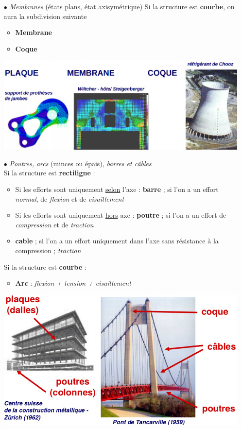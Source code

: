 \begin{itemize}
\item[$\bullet$] \textit{Membranes} (états plans, état axisymétrique)
Si la structure est \textbf{courbe}, on aura la subdivision suivante 
	\begin{itemize}
	\item \textbf{Membrane}
	\item \textbf{Coque}
	\end{itemize}
\begin{center}
\includegraphics[scale=0.4]{ch1/image1}
\end{center}
\newpage
\item[$\bullet$] \textit{Poutres, arcs} (minces ou épais), \textit{
barres et câbles}\\
Si la structure est \textbf{rectiligne} :
	\begin{itemize}
	\item Si les efforts sont uniquement \underline{selon} l'axe : 
	\textbf{barre} ;  si l'on a un effort \textit{normal}, de 
	\textit{flexion} et de \textit{cisaillement}
	\item Si les efforts sont uniquement \underline{hors} axe : 
	\textbf{poutre}	;  si l'on a un effort de \textit{compression} 
	et de \textit{traction}
	\item \textbf{cable}	;  si l'on a un effort uniquement dans l'axe 
	sans résistance à la compression ; \textit{traction}
	\end{itemize}
Si la structure est \textbf{courbe} :
	\begin{itemize}
	\item \textbf{Arc } : \textit{flexion + tension + cisaillement}
	\end{itemize}	
	
\begin{center}
\includegraphics[scale=0.5]{ch1/image2}
\end{center}
\end{itemize}



